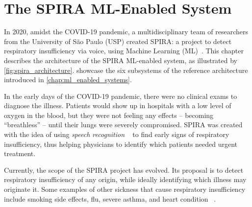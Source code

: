 
\chapter{The SPIRA ML-Enabled System}
\label{chap:the_spira_system}

In 2020, amidst the COVID-19 pandemic, a multidisciplinary team of
researchers from the University of São Paulo (USP) created SPIRA:
a project to detect respiratory insufficiency via voice, using
Machine Learning (ML)~\parencite{Finger2021DetectingProject}.
This chapter describes the architecture of the SPIRA ML-enabled
system, as illustrated by \cref{fig:spira_architecture}.
showcase the six subsystems of the reference architecture introduced
in \cref{chap:ml_enabled_systems}. 

In the early days of the COVID-19 pandemic, there were no clinical exams
to diagnose the illness. Patients would show up in hospitals with a low
level of oxygen in the blood, but they were not feeling any effects --
becoming ``breathless'' -- until their lungs were severely compromised.
SPIRA was created with the idea of using \emph{speech recognition}%
~\parencite{RussellS2021Artificial4th} to find early signs of
respiratory insufficiency, thus helping physicians to identify
which patients needed urgent treatment.

Currently, the scope of the SPIRA project has evolved. Its proposal
is to detect respiratory insufficiency of any origin, while ideally
identifying which illness may originate it. Some examples of other
sickness that cause respiratory insufficiency include smoking
side effects, flu, severe asthma, and heart condition%
~\parencite{Finger2021DetectingProject}.

